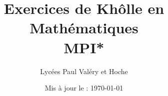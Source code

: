 \documentclass[letterpaper, 10pt]{article}
\newcommand{\1}{\mathds{1}} %
\theoremstyle{plain}
\begin{document}

\title{\Huge \bfseries Exercices de Khôlle en Mathématiques\\ 
\huge MPI*}


\author{\normalsize Lycées Paul Valéry et Hoche}
\date{\normalsize\vspace{-1ex} Mis à jour le : \today}


\maketitle
\tableofcontents\label{sec:contents}

\newpage




\end{document}
